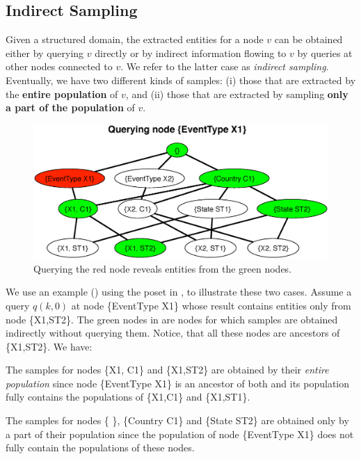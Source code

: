\subsection{Indirect Sampling}
\label{sec:indirectsampling}
Given a structured domain, the extracted entities for a node $v$ can be obtained either by querying $v$ directly or by indirect information flowing to $v$ by queries at other nodes connected to $v$. We refer to the latter case as {\em indirect sampling}. Eventually, we have two different kinds of samples: (i) those that are extracted by the {\bf entire population} of $v$, and (ii) those that are extracted by sampling {\bf only a part of the population} of $v$. 
\begin{figure}
	\begin{center}
	\vspace{-10pt}
	\includegraphics[clip,scale=0.25]{figs/exampleQuery.eps}	
	\vspace{-10pt}
	\caption{Querying the red node reveals entities from the green nodes.}
	\label{fig:query}
	\vspace{-10pt}
	\end{center}
\end{figure}
We use an example () using the poset in , to illustrate these two cases. Assume a query $q(k,0)$ at node \{EventType X1\} whose result contains entities only from node \{X1,ST2\}. The green nodes in  are nodes for which samples are obtained indirectly without querying them. Notice, that all these nodes are ancestors of \{X1,ST2\}. We have:
\squishlist
\item The samples for nodes \{X1, C1\} and \{X1,ST2\} are obtained by their {\em entire population} since node \{EventType X1\} is an ancestor of both and its population fully contains the populations of \{X1,C1\} and \{X1,ST1\}. 
\item The samples for nodes \{ \}, \{Country C1\} and \{State ST2\} are obtained only by a part of their population since the population of node \{EventType X1\} does not fully contain the populations of these nodes. 
\squishend

